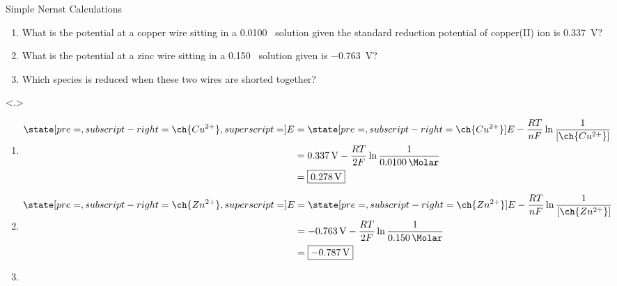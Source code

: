 \documentclass[notes=only]{beamer}
\begin{document}
\begin{frame}{Simple Nernst Calculations}
	\begin{enumerate}[<+->]
		\item What is the potential at a copper wire sitting in a
			\SI{0.0100}{\Molar}~ solution given the
			standard reduction potential of copper(II) ion is
			\SI{0.337}{\volt}?
			
			\vfill

		\item What is the potential at a zinc wire sitting in a
			\SI{0.150}{\Molar}~ solution given
			 is
			\SI{-0.763}{\volt}?

			\vfill

		\item Which species is reduced when these two wires are shorted
			together?

			\vspace{3em}
	\end{enumerate}

	{
	\begin{enumerate}
		\item \begin{align*}
				\state[pre=,subscript-right=\ch{Cu^{2+}},superscript=]{E}
				&= \state[pre=,subscript-right=\ch{Cu^{2+}}]{E} -
				\frac{RT}{nF} \ln \frac{1}{[\ch{Cu^{2+}}]} \\
				&= \SI{0.337}{\volt} - \frac{RT}{2F} \ln
				\frac{1}{\SI{0.0100}{\Molar}} \\
				&= \fbox{\SI{0.278}{\volt}}
			\end{align*}
		\item \begin{align*}
				\state[pre=,subscript-right=\ch{Zn^{2+}},superscript=]{E}
				&= \state[pre=,subscript-right=\ch{Zn^{2+}}]{E} -
				\frac{RT}{nF} \ln \frac{1}{[\ch{Zn^{2+}}]} \\
				&= \SI{-0.763}{\volt} - \frac{RT}{2F} \ln
				\frac{1}{\SI{0.150}{\Molar}} \\
				&= \fbox{\SI{-0.787}{\volt}}
			\end{align*}
		\item {}

	\end{enumerate}}
\end{frame}

\clearpage
\end{document}
